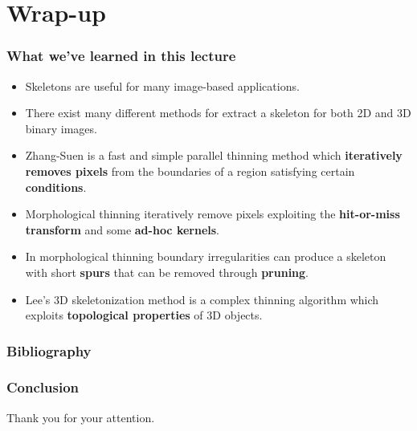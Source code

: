 \section{Wrap-up}
\begin{frame}[c]
  \frametitle{What we’ve learned in this lecture}
  \begin{itemize}
    \item Skeletons are useful for many image-based applications.
    \item There exist many different methods for extract a skeleton for both 2D and 3D binary images.
    \item Zhang-Suen is a fast and simple parallel thinning method which \textbf{iteratively removes pixels} from the boundaries of a region satisfying certain \textbf{conditions}.
    \item Morphological thinning iteratively remove pixels exploiting the \textbf{hit-or-miss transform} and some \textbf{ad-hoc kernels}.
    \item In morphological thinning boundary irregularities can produce a skeleton with short \textbf{spurs} that can be removed through \textbf{pruning}.
    \item Lee's 3D skeletonization method is a complex thinning algorithm which exploits \textbf{topological properties} of 3D objects.
  \end{itemize}
\end{frame}

\begin{frame}[shrink=20]
  \frametitle{Bibliography}
  \printbibliography
\end{frame}

\begin{frame}
  \frametitle{Conclusion}
  \begin{center}
    \Huge Thank you for your attention.
  \end{center}
\end{frame}